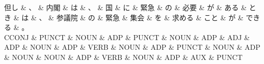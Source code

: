 \documentclass[tikz,border=5pt]{standalone}
\begin{document}
\normalsize
\begin{dependency}[edge unit distance=12.0pt]
    \begin{deptext}[column sep=1em]
        但し \& 、 \& 内閣 \& は \& 、 \& 国 \& に \& 緊急 \& の \& 必要 \& が \& ある \& とき \& は \& 、 \& 参議院 \& の \& 緊急 \& 集会 \& を \& 求める \& こと \& が \& できる \& 。\\
        CCONJ \& PUNCT \& NOUN \& ADP \& PUNCT \& NOUN \& ADP \& ADJ \& ADP \& NOUN \& ADP \& VERB \& NOUN \& ADP \& PUNCT \& NOUN \& ADP \& NOUN \& NOUN \& ADP \& VERB \& NOUN \& ADP \& AUX \& PUNCT\\
    \end{deptext}
\end{dependency}
\end{document}
